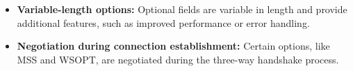 \vspace{-0.25em}
\begin{itemize}
    \item \textbf{Variable-length options:} Optional fields are variable in length and provide additional features, such as improved performance or error handling.
    \item \textbf{Negotiation during connection establishment:} Certain options, like MSS and WSOPT, are negotiated during the three-way handshake process.
\end{itemize}

